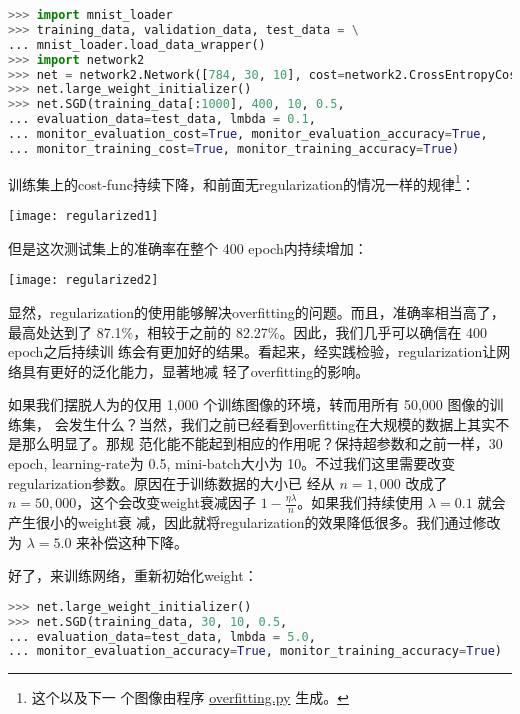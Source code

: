 \begin{lstlisting}[language=Python]
>>> import mnist_loader
>>> training_data, validation_data, test_data = \
... mnist_loader.load_data_wrapper()
>>> import network2
>>> net = network2.Network([784, 30, 10], cost=network2.CrossEntropyCost)
>>> net.large_weight_initializer()
>>> net.SGD(training_data[:1000], 400, 10, 0.5,
... evaluation_data=test_data, lmbda = 0.1,
... monitor_evaluation_cost=True, monitor_evaluation_accuracy=True,
... monitor_training_cost=True, monitor_training_accuracy=True)
\end{lstlisting}

训练集上的\gls*{cost-func}持续下降，和前面无\gls*{regularization}的情况一样的规律\footnote{这个以及下一
  个图像由程序
  \href{https://github.com/mnielsen/neural-networks-and-deep-learning/blob/master/fig/overfitting.py}{overfitting.py}
  生成。}：
\begin{center}
  \texttt{[image: regularized1]}
\end{center}

但是这次测试集上的准确率在整个 400 \gls*{epoch}内持续增加：
\begin{center}
  \texttt{[image: regularized2]}
\end{center}

显然，\gls*{regularization}的使用能够解决\gls*{overfitting}的问题。而且，准确率相当高了，最高处达到了
87.1\%，相较于之前的 82.27\%。因此，我们几乎可以确信在 400 \gls*{epoch}之后持续训
练会有更加好的结果。看起来，经实践检验，\gls*{regularization}让网络具有更好的泛化能力，显著地减
轻了\gls*{overfitting}的影响。

如果我们摆脱人为的仅用 1,000 个训练图像的环境，转而用所有 50,000 图像的训练集，
会发生什么？当然，我们之前已经看到\gls*{overfitting}在大规模的数据上其实不是那么明显了。那规
范化能不能起到相应的作用呢？保持超参数和之前一样，30 \gls*{epoch}, \gls*{learning-rate}为 0.5,
\gls*{mini-batch}大小为 10。不过我们这里需要改变\gls*{regularization}参数。原因在于训练数据的大小已
经从 $n=1,000$ 改成了 $n=50,000$，这个会改变\gls*{weight}衰减因子
$1-\frac{\eta\lambda}{n}$。如果我们持续使用 $\lambda = 0.1$ 就会产生很小的\gls*{weight}衰
减，因此就将\gls*{regularization}的效果降低很多。我们通过修改为 $\lambda = 5.0$ 来补偿这种下降。

好了，来训练网络，重新初始化\gls*{weight}：

\begin{lstlisting}[language=Python]
>>> net.large_weight_initializer()
>>> net.SGD(training_data, 30, 10, 0.5,
... evaluation_data=test_data, lmbda = 5.0,
... monitor_evaluation_accuracy=True, monitor_training_accuracy=True)
\end{lstlisting}

